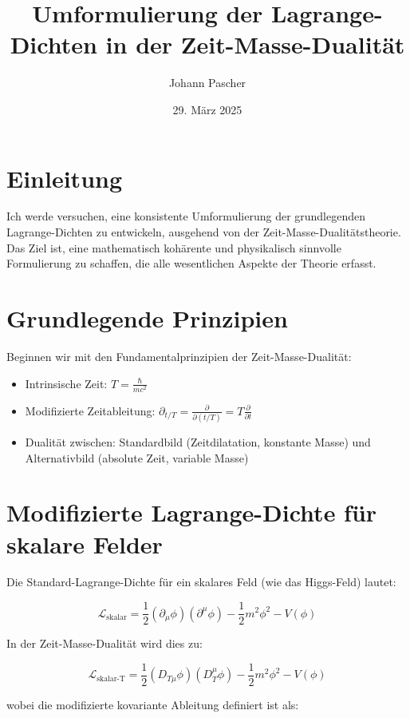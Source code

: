 \documentclass{article}
\title{Umformulierung der Lagrange-Dichten in der Zeit-Masse-Dualität}
\author{Johann Pascher}
\date{29. März 2025}
\begin{document}
	
	\maketitle
	
	\section*{Einleitung}
	Ich werde versuchen, eine konsistente Umformulierung der grundlegenden Lagrange-Dichten zu entwickeln, ausgehend von der Zeit-Masse-Dualitätstheorie. Das Ziel ist, eine mathematisch kohärente und physikalisch sinnvolle Formulierung zu schaffen, die alle wesentlichen Aspekte der Theorie erfasst.
	
	\section{Grundlegende Prinzipien}
	Beginnen wir mit den Fundamentalprinzipien der Zeit-Masse-Dualität:
	
	\begin{itemize}
		\item Intrinsische Zeit: \( T = \frac{\hbar}{m c^2} \)
		\item Modifizierte Zeitableitung: \( \partial_{t/T} = \frac{\partial}{\partial(t/T)} = T \frac{\partial}{\partial t} \)
		\item Dualität zwischen: Standardbild (Zeitdilatation, konstante Masse) und Alternativbild (absolute Zeit, variable Masse)
	\end{itemize}
	
	\section{Modifizierte Lagrange-Dichte für skalare Felder}
	Die Standard-Lagrange-Dichte für ein skalares Feld (wie das Higgs-Feld) lautet:
	
	\begin{equation}
		\mathcal{L}_{\text{skalar}} = \frac{1}{2} (\partial_\mu \phi) (\partial^\mu \phi) - \frac{1}{2} m^2 \phi^2 - V(\phi)
	\end{equation}
	
	In der Zeit-Masse-Dualität wird dies zu:
	
	\begin{equation}
		\mathcal{L}_{\text{skalar-T}} = \frac{1}{2} (D_{T\mu} \phi) (D_T^\mu \phi) - \frac{1}{2} m^2 \phi^2 - V(\phi)
	\end{equation}
	
	wobei die modifizierte kovariante Ableitung definiert ist als:
	
\end{document}
